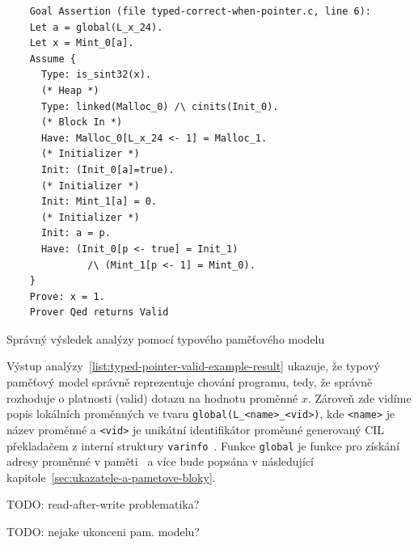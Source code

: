 \begin{listing}[H]
    \begin{verbatim}
    Goal Assertion (file typed-correct-when-pointer.c, line 6):
    Let a = global(L_x_24).
    Let x = Mint_0[a].
    Assume {
      Type: is_sint32(x).
      (* Heap *)
      Type: linked(Malloc_0) /\ cinits(Init_0).
      (* Block In *)
      Have: Malloc_0[L_x_24 <- 1] = Malloc_1.
      (* Initializer *)
      Init: (Init_0[a]=true).
      (* Initializer *)
      Init: Mint_1[a] = 0.
      (* Initializer *)
      Init: a = p.
      Have: (Init_0[p <- true] = Init_1)
              /\ (Mint_1[p <- 1] = Mint_0).
    }
    Prove: x = 1.
    Prover Qed returns Valid
    \end{verbatim}
    \caption{Správný výsledek analýzy pomocí typového paměťového modelu}
    \label{list:typed-pointer-valid-example-result}
\end{listing}

Výstup analýzy~\ref{list:typed-pointer-valid-example-result} ukazuje,
že typový paměťový model správně reprezentuje chování programu,
tedy, že správně rozhoduje o platnosti (valid) dotazu na hodnotu proměnné $x$.
Zároveň zde vidíme popis lokálních proměnných ve tvaru \texttt{global(L\_<name>\_<vid>)},
kde \texttt{<name>} je název proměnné a \texttt{<vid>} je unikátní identifikátor proměnné
generovaný CIL překladačem z interní struktury \texttt{varinfo}~\cite{FCPluginDevSignoles2024}.
Funkce \texttt{global} je funkce pro získání adresy proměnné v paměti~\cite{BlanchardWP2024}
a více bude popsána v následující kapitole~\ref{sec:ukazatele-a-pametove-bloky}.

TODO: read-after-write problematika?

TODO: nejake ukonceni pam. modelu?



